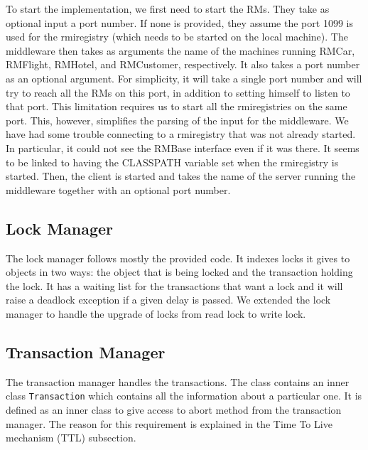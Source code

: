 \documentclass[12pt]{article}
\theoremstyle{plain}%
\theoremstyle{definition}
\theoremstyle{remark}
\newcommand{\java}[1]{{\lstinline!#1!}}
\begin{document}
To start the implementation, we first need to start the RMs. They take
as optional input a port number. If none is provided, they assume the
port 1099 is used for the rmiregistry (which needs to be started on
the local machine). The middleware then takes as arguments the name of
the machines running RMCar, RMFlight, RMHotel, and RMCustomer,
respectively. It also takes a port number as an optional argument. For
simplicity, it will take a single port number and will try to reach
all the RMs on this port, in addition to setting himself to listen to
that port. This limitation requires us to start all the rmiregistries
on the same port. This, however, simplifies the parsing of the input
for the middleware. We have had some trouble connecting to a
rmiregistry that was not already started. In particular, it could not
see the RMBase interface even if it was there. It seems to be linked to
having the CLASSPATH variable set when the rmiregistry is started.
Then, the client is started and takes the name of the server running
the middleware together with an optional port number.


\subsection*{Lock Manager}

The lock manager follows mostly the provided code. It indexes locks it gives to objects in two ways: the object that is being locked and the transaction holding the lock. It has a waiting list for the transactions that want a lock and it will raise a deadlock exception if a given delay is passed. We extended the lock manager to handle the upgrade of locks from read lock to write lock.

\subsection*{Transaction Manager}

The transaction manager handles the transactions. The class contains an inner class \java{Transaction} which contains all the information about a particular one. It is defined as an inner class to give access to abort method from the transaction manager. The reason for this requirement is explained in the Time To Live mechanism (TTL) subsection. 
\end{document}

